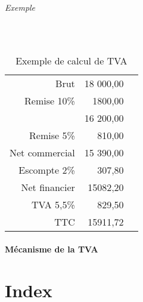 \documentclass[11pt]{article}
\begin{document}
			\paragraph{Exemple}~\\
				\begin{table}[H]
					\begin{center}
						\begin{tabular}{rrl}
							Brut & 18 000,00\\
							Remise 10\% & 1800,00\\
							\cline{2-2} & 16 200,00\\
							Remise 5\% & 810,00 \\
							\cline{2-2} Net commercial & 15 390,00 \\
							Escompte 2\% & 307,80 \\
							\cline{2-2} Net financier & 15082,20\\
							TVA 5,5\% & 829,50\\
							\cline{2-2} TTC & 15911,72
						\end{tabular}
					\end{center}
					\caption{Exemple de calcul de TVA}
				\end{table}
				
		\subsection{Mécanisme de la TVA}
		
		
\appendix
\newpage
\part*{Index}
\tableofcontents
\newpage
\listoftables
\listoffigures
\end{document}
